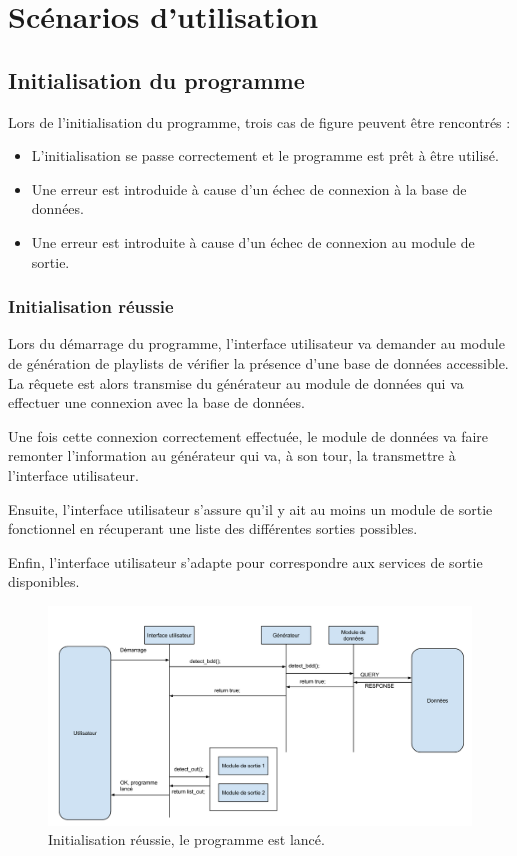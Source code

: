 
\section{Scénarios d'utilisation}

\subsection{Initialisation du programme}
    
Lors de l'initialisation du programme, trois cas de figure peuvent être
rencontrés : 

\begin{itemize}
\item L'initialisation se passe correctement et le programme est prêt à être
utilisé.
\item Une erreur est introduide à cause d'un échec de connexion à la base de
données.
\item Une erreur est introduite à cause d'un échec de connexion au module de
sortie.
\end{itemize}

\subsubsection{Initialisation réussie}

Lors du démarrage du programme, l'interface utilisateur va demander au 
module de génération de playlists de vérifier la présence d'une base de 
données accessible. La rêquete est alors transmise du générateur au module 
de données qui va effectuer une connexion avec la base de données.
        
Une fois cette connexion correctement effectuée, le module de données va 
faire remonter l'information au générateur qui va, à son tour, la 
transmettre à l'interface utilisateur.

Ensuite, l'interface utilisateur s'assure qu'il y ait au moins un module de 
sortie fonctionnel en récuperant une liste des différentes sorties possibles.

Enfin, l'interface utilisateur s'adapte pour correspondre aux services de 
sortie disponibles.
        
\begin{figure}[!h]
\includegraphics[width=14cm]{data/demarrage_fonctionnel.png}
\caption{Initialisation réussie, le programme est lancé.}          
\end{figure}
        
